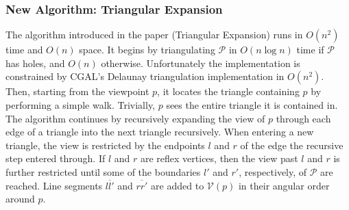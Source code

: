 \subsubsection{New Algorithm: Triangular Expansion}
The algorithm introduced in the paper (Triangular Expansion) runs in $O(n^2)$ time and $O(n)$ space. It begins by triangulating $\mathcal P$ in $O(n \log n)$ time if $\mathcal P$ has holes, and $O(n)$ otherwise. Unfortunately the implementation is constrained by CGAL's Delaunay triangulation implementation in $O(n^2)$. Then, starting from the viewpoint $p$, it locates the triangle containing $p$ by performing a simple walk. Trivially, $p$ sees the entire triangle it is contained in. The algorithm continues by recursively expanding the view of $p$ through each edge of a triangle into the next triangle recursively. When entering a new triangle, the view is restricted by the endpoints $l$ and $r$ of the edge the recursive step entered through. If $l$ and $r$ are reflex vertices, then the view past $l$ and $r$ is further restricted until some of the boundaries $l'$ and $r'$, respectively, of $\mathcal P$ are reached. Line segments $\overline{ll'}$ and $\overline{rr'}$ are added to $\mathcal V(p)$ in their angular order around $p$.


